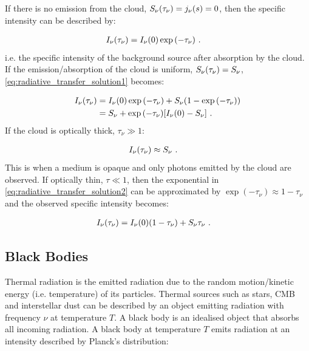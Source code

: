 If there is no emission from the cloud, $S_\nu\qty(\tau_\nu)=j_\nu\qty(s)=0$, then the specific intensity can be described by:

\begin{equation}
    \begin{aligned}
        I_\nu\qty(\tau_\nu)&=I_\nu\qty(0)\exp\qty(-\tau_\nu)\text{ .}
    \end{aligned}
\end{equation}
\noindent i.e. the specific intensity of the background source after absorption by the cloud. If the emission/absorption of the cloud is uniform, $S_\nu\qty(\tau_\nu)=S_\nu$, \autoref{eq:radiative_transfer_solution1} becomes:

\begin{equation}
	\begin{aligned}
		I_\nu\qty(\tau_\nu)&=I_\nu\qty(0)\exp\qty(-\tau_\nu)+S_\nu\qty(1-\exp\qty(-\tau_\nu)) \\
        &=S_\nu + \exp\qty(-\tau_\nu)\qty[I_\nu\qty(0)-S_\nu] \text{ .}
	\end{aligned} \label{eq:radiative_transfer_solution2}
\end{equation}
\noindent If the cloud is optically thick, $\tau_\nu\gg 1$:

\begin{equation}
    \begin{aligned}
        I_\nu\qty(\tau_\nu)&\approx S_\nu\text{ .}
    \end{aligned}
\end{equation}
\noindent This is when a medium is opaque and only photons emitted by the cloud are observed. If optically thin, $\tau \ll 1$, then the exponential in \autoref{eq:radiative_transfer_solution2} can be approximated by $\exp(-\tau_\nu)\approx 1-\tau_\nu$ and the observed specific intensity becomes:

\begin{equation}
	\begin{aligned}
		I_\nu\qty(\tau_\nu)&=I_\nu\qty(0)\qty(1-\tau_\nu)+S_\nu\tau_\nu\text{ .}
	\end{aligned}
\end{equation}

\subsection{Black Bodies} \label{sec:06_blackbodies}

Thermal radiation is the emitted radiation due to the random motion/kinetic energy (i.e. temperature) of its particles. Thermal sources such as stars, CMB and interstellar dust can be described by an object emitting radiation with frequency $\nu$ at temperature $T$. A black body is an idealised object that absorbs all incoming radiation. A black body at temperature $T$ emits radiation at an intensity described by Planck's distribution:

